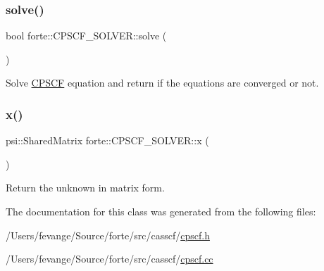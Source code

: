 \subsubsection{\texorpdfstring{solve()}{solve()}}
{\footnotesize\ttfamily bool forte\+::\+C\+P\+S\+C\+F\+\_\+\+S\+O\+L\+V\+E\+R\+::solve (\begin{DoxyParamCaption}{ }\end{DoxyParamCaption})}



Solve \mbox{\hyperlink{classforte_1_1_c_p_s_c_f}{C\+P\+S\+CF}} equation and return if the equations are converged or not. 

\mbox{\label{classforte_1_1_c_p_s_c_f___s_o_l_v_e_r_a3d1a12199bb5114f71216738404f8fce}} 
\subsubsection{\texorpdfstring{x()}{x()}}
{\footnotesize\ttfamily psi\+::\+Shared\+Matrix forte\+::\+C\+P\+S\+C\+F\+\_\+\+S\+O\+L\+V\+E\+R\+::x (\begin{DoxyParamCaption}{ }\end{DoxyParamCaption})}



Return the unknown in matrix form. 



The documentation for this class was generated from the following files\+:\begin{DoxyCompactItemize}
\item 
/\+Users/fevange/\+Source/forte/src/casscf/\mbox{\hyperlink{cpscf_8h}{cpscf.\+h}}\item 
/\+Users/fevange/\+Source/forte/src/casscf/\mbox{\hyperlink{cpscf_8cc}{cpscf.\+cc}}\end{DoxyCompactItemize}
